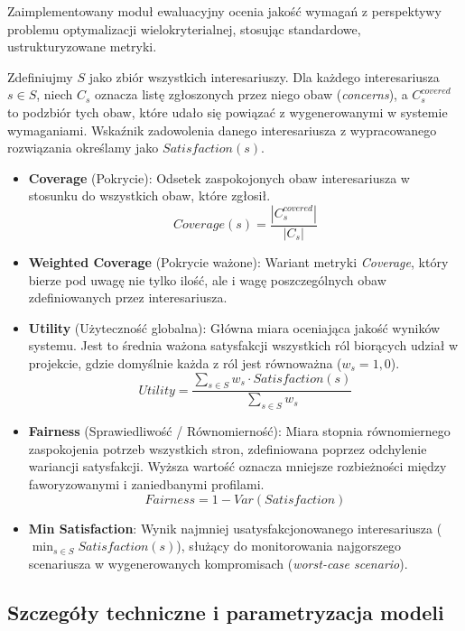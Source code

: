 \documentclass[conference]{IEEEtran}
\begin{document}
Zaimplementowany moduł ewaluacyjny ocenia jakość wymagań z perspektywy problemu optymalizacji wielokryterialnej, stosując standardowe, ustrukturyzowane metryki. 

Zdefiniujmy $S$ jako zbiór wszystkich interesariuszy. Dla każdego interesariusza $s \in S$, niech $C_s$ oznacza listę zgłoszonych przez niego obaw (\textit{concerns}), a $C_s^{covered}$ to podzbiór tych obaw, które udało się powiązać z wygenerowanymi w systemie wymaganiami. Wskaźnik zadowolenia danego interesariusza z wypracowanego rozwiązania określamy jako $Satisfaction(s)$.

\begin{itemize}
\item \textbf{Coverage} (Pokrycie): Odsetek zaspokojonych obaw interesariusza w stosunku do wszystkich obaw, które zgłosił.
\[ Coverage(s) = \frac{|C_s^{covered}|}{|C_s|} \]

\item \textbf{Weighted Coverage} (Pokrycie ważone): Wariant metryki \textit{Coverage}, który bierze pod uwagę nie tylko ilość, ale i wagę poszczególnych obaw zdefiniowanych przez interesariusza.

\item \textbf{Utility} (Użyteczność globalna): Główna miara oceniająca jakość wyników systemu. Jest to średnia ważona satysfakcji wszystkich ról biorących udział w projekcie, gdzie domyślnie każda z ról jest równoważna ($w_s = 1{,}0$).
\[ Utility = \frac{\sum_{s \in S} w_s \cdot Satisfaction(s)}{\sum_{s \in S} w_s} \]

\item \textbf{Fairness} (Sprawiedliwość / Równomierność): Miara stopnia równomiernego zaspokojenia potrzeb wszystkich stron, zdefiniowana poprzez odchylenie wariancji satysfakcji. Wyższa wartość oznacza mniejsze rozbieżności między faworyzowanymi i zaniedbanymi profilami.
\[ Fairness = 1 - Var(Satisfaction) \]

\item \textbf{Min Satisfaction}: Wynik najmniej usatysfakcjonowanego interesariusza ($\min_{s \in S} Satisfaction(s)$), służący do monitorowania najgorszego scenariusza w wygenerowanych kompromisach (\textit{worst-case scenario}).
\end{itemize}

\subsection{Szczegóły techniczne i parametryzacja modeli}
\end{document}
